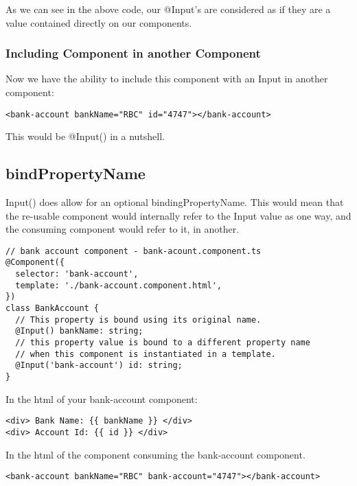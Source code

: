 As we can see in the above code, our @Input's are considered as if they are
a value contained directly on our components.


\subsubsection{ Including Component in another Component }
Now we have the ability to include this component with an Input in another
component:
\begin{lstlisting}
<bank-account bankName="RBC" id="4747"></bank-account>
\end{lstlisting}

This would be @Input() in a nutshell.

\subsection{ bindPropertyName }
Input() does allow for an optional bindingPropertyName. This would mean that
the re-usable component would internally refer to the Input value as one way,
and the consuming component would refer to it, in another.

\begin{lstlisting}
// bank account component - bank-acount.component.ts
@Component({
  selector: 'bank-account',
  template: './bank-account.component.html',
})
class BankAccount {
  // This property is bound using its original name.
  @Input() bankName: string;
  // this property value is bound to a different property name
  // when this component is instantiated in a template.
  @Input('bank-account') id: string;
}
\end{lstlisting}

In the html of your bank-account component:
\begin{lstlisting}
<div> Bank Name: {{ bankName }} </div>
<div> Account Id: {{ id }} </div>
\end{lstlisting}

In the html of the component consuming the bank-account component.
\begin{lstlisting}
<bank-account bankName="RBC" bank-account="4747"></bank-account>
\end{lstlisting}
